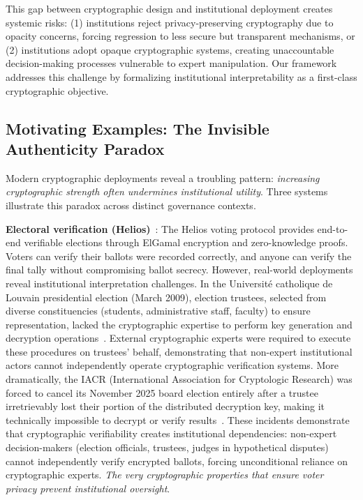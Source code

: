 \documentclass{ieeeaccess}
\begin{document}
This gap between cryptographic design and institutional deployment creates systemic risks: (1) institutions reject privacy-preserving cryptography due to opacity concerns, forcing regression to less secure but transparent mechanisms, or (2) institutions adopt opaque cryptographic systems, creating unaccountable decision-making processes vulnerable to expert manipulation. Our framework addresses this challenge by formalizing institutional interpretability as a first-class cryptographic objective.

\subsection{Motivating Examples: The Invisible Authenticity Paradox}
\label{subsec:motivating_examples}

Modern cryptographic deployments reveal a troubling pattern: \emph{increasing cryptographic strength often undermines institutional utility}. Three systems illustrate this paradox across distinct governance contexts.

\textbf{Electoral verification (Helios)}~\cite{Adida08}: The Helios voting protocol provides end-to-end verifiable elections through ElGamal encryption and zero-knowledge proofs. Voters can verify their ballots were recorded correctly, and anyone can verify the final tally without compromising ballot secrecy. However, real-world deployments reveal institutional interpretation challenges. In the Université catholique de Louvain presidential election (March 2009), election trustees, selected from diverse constituencies (students, administrative staff, faculty) to ensure representation, lacked the cryptographic expertise to perform key generation and decryption operations~\cite{Adida09UCL}. External cryptographic experts were required to execute these procedures on trustees' behalf, demonstrating that non-expert institutional actors cannot independently operate cryptographic verification systems. More dramatically, the IACR (International Association for Cryptologic Research) was forced to cancel its November 2025 board election entirely after a trustee irretrievably lost their portion of the distributed decryption key, making it technically impossible to decrypt or verify results~\cite{IACR2025incident}. These incidents demonstrate that cryptographic verifiability creates institutional dependencies: non-expert decision-makers (election officials, trustees, judges in hypothetical disputes) cannot independently verify encrypted ballots, forcing unconditional reliance on cryptographic experts. \emph{The very cryptographic properties that ensure voter privacy prevent institutional oversight}.
\end{document}
